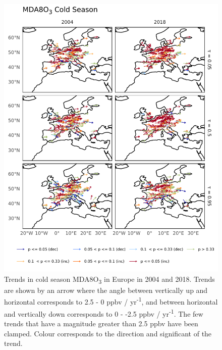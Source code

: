 \documentclass{article}
\begin{document}
\begin{figure}[p]
\centering
\includegraphics[height=0.9\textheight]{figures/si_figures/fS07_o3_map_mda8_cold_eu_o3.pdf}
\caption{Trends in cold season MDA8O\textsubscript{3} in Europe in 2004 and 2018. Trends are shown by an arrow where the angle between vertically up and horizontal corresponds to 2.5 - 0 ppbv / yr\textsuperscript{-1}, and between horizontal and vertically down corresponds to 0 - -2.5 ppbv / yr\textsuperscript{-1}. The few trends that have a magnitude greater than 2.5 ppbv have been clamped. Colour corresponds to the direction and significant of the trend.}
\label{si_fig:o3_map_eu_mda8_cold}
\end{figure}
\clearpage
\end{document}
